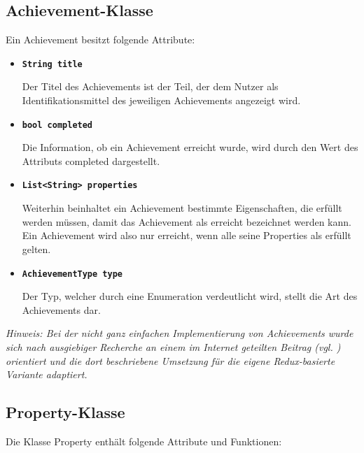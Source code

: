 \documentclass[bibliography=totoc,listof=totoc,BCOR=5mm,DIV=12,oneside]{scrbook}
\begin{document}
\subsection{Achievement-Klasse}
\par Ein Achievement besitzt folgende Attribute:

\begin{itemize}
\item[] \texttt{\textbf{String title}}
\par Der Titel des Achievements ist der Teil, der dem Nutzer als Identifikationsmittel des jeweiligen Achievements angezeigt wird.  

\item[] \texttt{\textbf{bool completed}}
\par Die Information, ob ein Achievement erreicht wurde, wird durch den Wert des Attributs completed dargestellt.

\item[] \texttt{\textbf{List<String> properties}}
\par Weiterhin beinhaltet ein Achievement bestimmte Eigenschaften, die erfüllt werden müssen, damit das Achievement als erreicht bezeichnet werden kann. Ein Achievement wird also nur erreicht, wenn alle seine Properties als erfüllt gelten.  

\item[] \texttt{\textbf{AchievementType type}}
\par Der Typ, welcher durch eine Enumeration verdeutlicht wird, stellt die Art des Achievements dar.
\end{itemize}

\par \textit{Hinweis: Bei der nicht ganz einfachen Implementierung von Achievements wurde sich nach ausgiebiger Recherche an einem im Internet geteilten Beitrag (vgl. \citep{AchievementsImplementation}) orientiert und die dort beschriebene Umsetzung für die eigene Redux-basierte Variante adaptiert.}

\subsection{Property-Klasse}
\label{sub:propertyclass}
\par \medskip Die Klasse Property enthält folgende Attribute und Funktionen:
\end{document}
